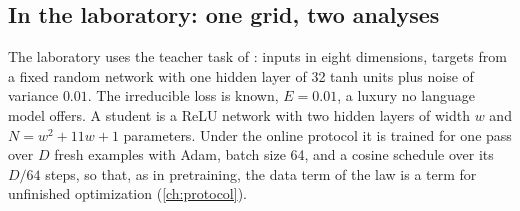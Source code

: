 \begin{refsection}
\section{In the laboratory: one grid, two analyses}\label{sec:fitting:lab}

The laboratory uses the teacher task of : inputs in eight dimensions, targets from a fixed random network with one hidden layer of 32 tanh units plus noise of variance $0.01$. The irreducible loss is known, $E=0.01$, a luxury no language model offers. A student is a ReLU network with two hidden layers of width $w$ and $N=w^2+11w+1$ parameters. Under the online protocol it is trained for one pass over $D$ fresh examples with Adam, batch size 64, and a cosine schedule over its $D/64$ steps, so that, as in pretraining, the data term of the law is a term for unfinished optimization (\cref{ch:protocol}).


\end{refsection}
